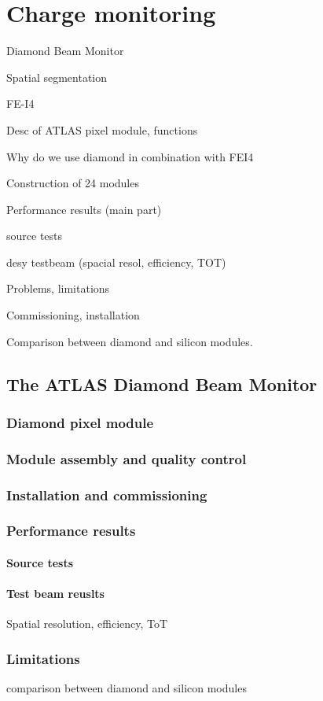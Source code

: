 \chapter{Charge monitoring}

Diamond Beam Monitor

Spatial segmentation

FE-I4

Desc of ATLAS pixel module, functions

Why do we use diamond in combination with FEI4

Construction of 24 modules

Performance results (main part)

source tests

desy testbeam (spacial resol, efficiency, TOT)

Problems, limitations

Commissioning, installation

Comparison between diamond and silicon modules.


\section{The ATLAS Diamond Beam Monitor}
\subsection{Diamond pixel module}
\subsection{Module assembly and quality control}
\subsection{Installation and commissioning}
\subsection{Performance results}
\subsubsection{Source tests}
\subsubsection{Test beam reuslts}
Spatial resolution, efficiency, ToT
\subsection{Limitations}
comparison between diamond and silicon modules



